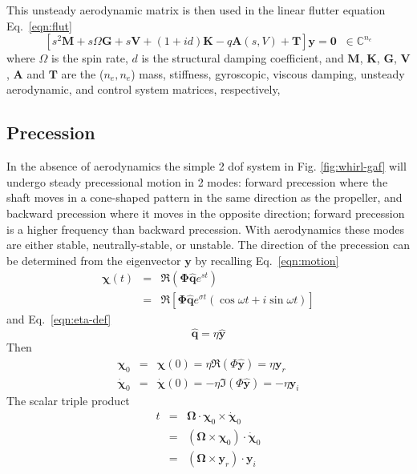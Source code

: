 \documentclass[11pt,openany,twoside]{book}
\numberwithin{equation}{section}		%
\newcommand{\Matrix}[1]{\boldsymbol{#1}}
\newcommand{\Vector}[1]{\boldsymbol{#1}}
\newcommand{\Eqn}[1]{Eq.\ \ref{#1}}  %
\newcommand{\Figref}[1]{Fig. \ref{#1}}  %
\begin{document}
This unsteady aerodynamic matrix is then used in the linear flutter equation
\Eqn{eqn:flut}
\begin{equation}
\left[ s^2 \Matrix{M} + s \Omega \Matrix{G} + s \Matrix{V} +
 (1 + id) \Matrix{K} - q \Matrix{A} (s,V) + \Matrix{T} \right]
  \Vector{y} = \Vector{0} \; \; \in \mathbb{C}^{n_e}
\end{equation}
where $\Omega$ is the spin rate, $d$ is the structural damping coefficient, and
$\Matrix{M}$, $\Matrix{K}$, $\Matrix{G}$, $\Matrix{V}$, $\Matrix{A}$ and $\Matrix{T}$ are the
($n_e,n_e$) mass, stiffness, gyroscopic, viscous damping,
unsteady aerodynamic, and control system matrices, respectively,

\subsection{Precession}\label{sect:precession}
In the absence of aerodynamics the simple 2 dof system in \Figref{fig:whirl-gaf}
will undergo steady precessional motion in 2 modes: forward precession
where the shaft moves in a cone-shaped pattern in the same direction as
the propeller, and backward precession where it moves in the opposite
direction; forward precession is a higher frequency than backward
precession.
With aerodynamics these modes are either stable,
neutrally-stable, or unstable.
The direction of the precession can be determined from the eigenvector
$\Vector{y}$ by recalling \Eqn{eqn:motion}
\begin{eqnarray} %
\Vector{\chi}(t) & = & \Re \left(\Matrix{\Phi}\hat{\Vector{q}}e^{st}\right) \nonumber \\
              & = & \Re \left[\Matrix{\Phi}\hat{\Vector{q}} e^{\sigma t}
				  			\left(\cos \omega t + i \sin \omega t \right) \right]
\end{eqnarray}
and \Eqn{eqn:eta-def}
\begin{equation}
\hat{\Vector{q}} = \eta \hat{\Vector{y}}
\end{equation}
Then
\begin{eqnarray}
\Vector{\chi}_0 &=& \Vector{\chi}(0) = \eta\Re(\Phi\hat{\Vector{y}})
	= \eta \Vector{y}_r \nonumber \\
\dot{\Vector{\chi}}_0 &=& \dot{\Vector{\chi}}(0) =
	-\eta\Im(\Phi\hat{\Vector{y}}) = -\eta \Vector{y}_i
\end{eqnarray}
The scalar triple product
\begin{eqnarray}
t &=& \Vector{\Omega} \cdot \Vector{\chi}_0 \times
		\dot{\Vector{\chi}}_0 \nonumber \\
 &=& \left(\Vector{\Omega} \times \Vector{\chi}_0 \right)
 		\cdot \dot{\Vector{\chi}}_0 \nonumber \\
 &=& \left(\Vector{\Omega} \times \Vector{y}_r \right) \cdot\Vector{y}_i
\end{eqnarray}
\end{document}
